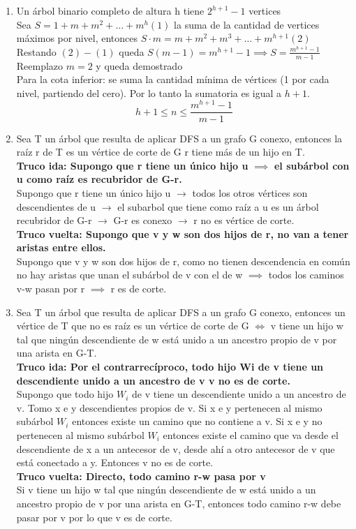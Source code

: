 \documentclass{article}
\begin{document}
\begin{enumerate}
    \item Un árbol binario completo de altura h tiene $2^{h+1}-1$ vertices \\
    Sea $S=1+m+m^2+\dots+m^h(1)$ la suma de la cantidad de vertices máximos por nivel, entonces $S\cdot m=m+m^2+m^3+\dots+m^{h+1}(2)$ \\
    Restando $(2)-(1)$ queda $S(m-1)=m^{h+1}-1 \implies S=\frac{m^{h+1}-1}{m-1}$ \\
    Reemplazo $m=2$ y queda demostrado \\
    Para la cota inferior: se suma la cantidad mínima de vértices (1 por cada nivel, partiendo del cero). Por lo tanto la sumatoria es igual a $h+1$. \\
    $$h+1\leq n \leq \frac{m^{h+1}-1}{m-1}$$
    
    \item Sea T un árbol que resulta de aplicar DFS a un grafo G conexo, entonces la raíz r de T es un vértice de corte de G  r tiene más de un hijo en T. \\
    \textbf{Truco ida: Supongo que r tiene un único hijo u} $\implies$ \textbf{el subárbol con u como raíz es recubridor de G-r.} \\
    Supongo que r tiene un único hijo u $\rightarrow$ todos los otros vértices son descendientes de u $\rightarrow$ el subarbol que tiene como raíz a u es un árbol recubridor de G-r $\rightarrow$ G-r es conexo $\rightarrow$ r no es vértice de corte. \\
    \textbf{Truco vuelta: Supongo que v y w son dos hijos de r, no van a tener aristas entre ellos.} \\
    Supongo que v y w son dos hijos de r, como no tienen descendencia en común no hay aristas que unan el subárbol de v con el de w $\implies$ todos los caminos v-w pasan por r $\implies$ r es de corte.
    
    \item Sea T un árbol que resulta de aplicar DFS a un grafo G conexo, entonces un vértice de T que no es raíz es un vértice de corte de G $\iff$ v tiene un hijo w tal que ningún descendiente de w está unido a un ancestro propio de v por una arista en G-T. \\
    \textbf{Truco ida: Por el contrarrecíproco, todo hijo Wi de v tiene un descendiente unido a un ancestro de v  v no es de corte.} \\
    Supongo que todo hijo $W_i$ de v tiene un descendiente unido a un ancestro de v. Tomo x e y descendientes propios de v. Si x e y pertenecen al mismo subárbol $W_i$ entonces existe un camino que no contiene a v. Si x e y no pertenecen al mismo subárbol $W_i$ entonces existe el camino que va desde el descendiente de x a un antecesor de v, desde ahí a otro antecesor de v que está conectado a y. Entonces v no es de corte. \\
    \textbf{Truco vuelta: Directo, todo camino r-w pasa por v} \\
    Si v tiene un hijo w tal que ningún descendiente de w está unido a un ancestro propio de v por una arista en G-T, entonces todo camino r-w debe pasar por v por lo que v es de corte.
    

\end{enumerate}
\end{document}
